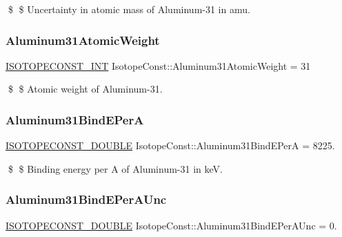 \$ \$ Uncertainty in atomic mass of Aluminum-\/31 in amu. \mbox{\label{group___isotope_const-_aluminum-_al31_gab3f313e096d24d246644c6d74b49bdf8}} 
\subsubsection{\texorpdfstring{Aluminum31\+Atomic\+Weight}{Aluminum31AtomicWeight}}
{\footnotesize\ttfamily \mbox{\hyperlink{group___isotope_const-_macros_ga5f18360b3e99483a35c32d789e62621c}{I\+S\+O\+T\+O\+P\+E\+C\+O\+N\+S\+T\+\_\+\+I\+NT}} Isotope\+Const\+::\+Aluminum31\+Atomic\+Weight = 31}

\$ \$ Atomic weight of Aluminum-\/31. \mbox{\label{group___isotope_const-_aluminum-_al31_ga52ae54d2aa8de7f99b8d21b291d23f17}} 
\subsubsection{\texorpdfstring{Aluminum31\+Bind\+E\+PerA}{Aluminum31BindEPerA}}
{\footnotesize\ttfamily \mbox{\hyperlink{group___isotope_const-_macros_ga8f45a7272ce02c0b4c65c44636ed719a}{I\+S\+O\+T\+O\+P\+E\+C\+O\+N\+S\+T\+\_\+\+D\+O\+U\+B\+LE}} Isotope\+Const\+::\+Aluminum31\+Bind\+E\+PerA = 8225.}

\$ \$ Binding energy per A of Aluminum-\/31 in keV. \mbox{\label{group___isotope_const-_aluminum-_al31_ga5d86ce6a9e6ef5373448f3a8d0d1e2d5}} 
\subsubsection{\texorpdfstring{Aluminum31\+Bind\+E\+Per\+A\+Unc}{Aluminum31BindEPerAUnc}}
{\footnotesize\ttfamily \mbox{\hyperlink{group___isotope_const-_macros_ga8f45a7272ce02c0b4c65c44636ed719a}{I\+S\+O\+T\+O\+P\+E\+C\+O\+N\+S\+T\+\_\+\+D\+O\+U\+B\+LE}} Isotope\+Const\+::\+Aluminum31\+Bind\+E\+Per\+A\+Unc = 0.}

